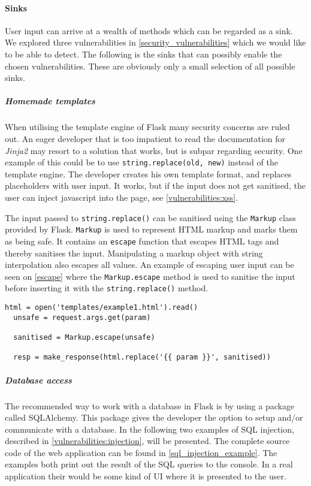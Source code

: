 \paragraph{Sinks}
User input can arrive at a wealth of methods which can be regarded as a sink.
We explored three vulnerabilities in \cref{security_vulnerabilities} which we would like to be able to detect.
The following is the sinks that can possibly enable the chosen vulnerabilities.
These are obviously only a small selection of all possible sinks.

\subparagraph{Homemade templates}
When utilising the template engine of Flask many security concerns are ruled out.
An eager developer that is too impatient to read the documentation for \emph{Jinja2} may resort to a solution that works, but is subpar regarding security.
One example of this could be to use \texttt{string.replace(old, new)} instead of the template engine.
The developer creates his own template format, and replaces placeholders with user input.
It works, but if the input does not get sanitised, the user can inject javascript into the page, see \cref{vulnerabilities:xss}.

The input passed to \texttt{string.replace()} can be sanitised using the \texttt{Markup} class provided by Flask.
\texttt{Markup} is used to represent HTML markup and marks them as being safe.
It contains an \texttt{escape} function that escapes HTML tags and thereby sanitises the input.
Manipulating a markup object with string interpolation also escapes all values.
An example of escaping user input can be seen on \cref{escape} where the \texttt{Markup.escape} method is used to sanitise the input before inserting it with the \texttt{string.replace()} method.

\begin{lstlisting}[style=python, caption={An example of escaping user input}, label={escape}]
  html = open('templates/example1.html').read()
  unsafe = request.args.get(param)

  sanitised = Markup.escape(unsafe)
  
  resp = make_response(html.replace('{{ param }}', sanitised))
\end{lstlisting}


\subparagraph{Database access}
The recommended way to work with a database in Flask is by using a package called SQLAlchemy\cite{sqlalchemy}.\cite{sqlalchemy_docs}
This package gives the developer the option to setup and/or communicate with a database.
In the following two examples of SQL injection, described in \cref{vulnerabilities:injection}, will be presented.
The complete source code of the web application can be found in \cref{sql_injection_example}.
The examples both print out the result of the SQL queries to the console.
In a real application their would be some kind of UI where it is presented to the user.


